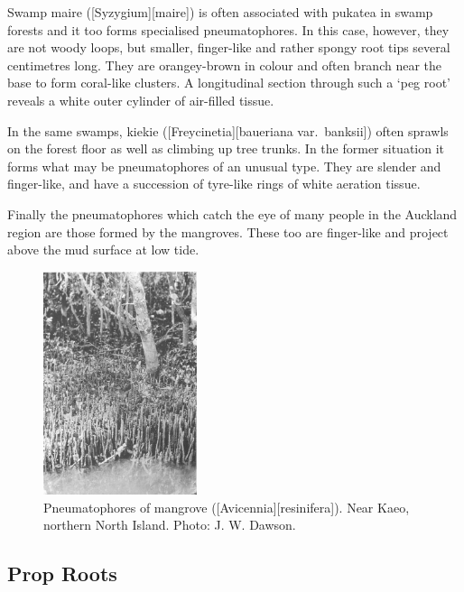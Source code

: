 Swamp maire ([Syzygium][maire]) is often associated with pukatea in swamp forests and it too forms specialised pneumatophores.
In this case, however, they are not woody loops, but smaller, finger-like and rather spongy root tips several centimetres long.
They are orangey-brown in colour and often branch near the base to form coral-like clusters.
A longitudinal section through such a `peg root' reveals a white outer cylinder of air-filled tissue.

In the same swamps, kiekie ([Freycinetia][baueriana var.\ banksii]) often sprawls on the forest floor as well as climbing up tree trunks.
In the former situation it forms what may be pneumatophores of an unusual type.
They are slender and finger-like, and have a succession of tyre-like rings of white aeration tissue.

Finally the pneumatophores which catch the eye of many people in the Auckland region are those formed by the mangroves.
These too are finger-like and project above the mud surface at low tide.

\begin{figure}
	\includegraphics[width=0.4\textwidth]{graphics/figure13mangrove.jpg}
	\centering
	\caption[Pneumatophores of mangrove]{Pneumatophores of mangrove ([Avicennia][resinifera]).
	Near Kaeo, northern North Island.
	Photo:  J. W. Dawson.}%
	\label{fig:13mangrove}
\end{figure}

\subsection{Prop Roots}

